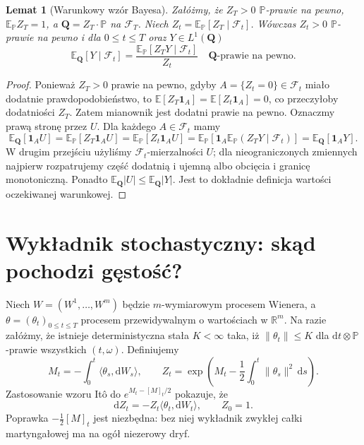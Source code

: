 \documentclass[11pt,a4paper,oneside]{report}
\numberwithin{equation}{chapter}
\theoremstyle{plain}
\newtheorem{lemat}[twierdzenie]{Lemat}
\theoremstyle{definition}
\theoremstyle{remark}
\newcommand{\R}{\mathbb{R}}
\newcommand{\Prob}{\mathbb{P}}
\newcommand{\E}{\mathbb{E}}
\newcommand{\calF}{\mathcal{F}}
\newcommand{\ind}[1]{\mathbf{1}_{#1}}
\newcommand{\dd}{\mathrm{d}}
\newcommand{\norm}[1]{\lVert #1\rVert}
\begin{document}
\begin{lemat}[Warunkowy wzór Bayesa]
\label{lem:bayes-change}
Załóżmy, że $Z_T>0$ $\Prob$-prawie na pewno,
$\E_{\Prob}Z_T=1$, a $\mathbf Q=Z_T\cdot\Prob$
na $\calF_T$. Niech $Z_t=\E_{\Prob}[Z_T\mid\calF_t]$.
Wówczas $Z_t>0$ $\Prob$-prawie na pewno i dla
$0\le t\le T$ oraz $Y\in L^1(\mathbf Q)$
\[
\E_{\mathbf Q}[Y\mid\calF_t]
=\frac{\E_{\Prob}[Z_TY\mid\calF_t]}{Z_t}
\quad\mathbf Q\text{-prawie na pewno}.
\tag{8.1}\label{eq:bayes-measure}
\]
\end{lemat}
\begin{proof}
Ponieważ $Z_T>0$ prawie na pewno, gdyby
$A=\{Z_t=0\}\in\calF_t$ miało dodatnie prawdopodobieństwo,
to $\E[Z_T\ind A]=\E[Z_t\ind A]=0$,
co przeczyłoby dodatniości $Z_T$. Zatem mianownik
jest dodatni prawie na pewno. Oznaczmy prawą stronę
przez $U$. Dla każdego $A\in\calF_t$ mamy
\[
\E_{\mathbf Q}[\ind A U]
=\E_{\Prob}[Z_T\ind A U]
=\E_{\Prob}[Z_t\ind A U]
=\E_{\Prob}[\ind A\E_{\Prob}(Z_TY\mid\calF_t)]
=\E_{\mathbf Q}[\ind A Y].
\]
W drugim przejściu użyliśmy $\calF_t$-mierzalności $U$;
dla nieograniczonych zmiennych najpierw rozpatrujemy
część dodatnią i ujemną albo obcięcia i granicę monotoniczną.
Ponadto $\E_{\mathbf Q}|U|\le\E_{\mathbf Q}|Y|$.
Jest to dokładnie definicja wartości oczekiwanej warunkowej.
\end{proof}

\section{Wykładnik stochastyczny: skąd pochodzi gęstość?}

Niech $W=(W^1,\ldots,W^m)$ będzie $m$-wymiarowym
procesem Wienera, a $\theta=(\theta_t)_{0\le t\le T}$
procesem przewidywalnym o wartościach w $\R^m$.
Na razie załóżmy, że istnieje deterministyczna stała
$K<\infty$ taka, iż $\norm{\theta_t}\le K$
dla $\dd t\otimes\Prob$-prawie wszystkich $(t,\omega)$.
Definiujemy
\[
M_t=-\int_0^t\langle\theta_s,\dd W_s\rangle,
\qquad
Z_t=\exp\left(M_t-\frac12\int_0^t\norm{\theta_s}^2\,\dd s\right).
\tag{8.2}\label{eq:girsanov-density}
\]
Zastosowanie wzoru Itô do $e^{M_t-[M]_t/2}$
pokazuje, że
\[
\dd Z_t=-Z_t\langle\theta_t,\dd W_t\rangle,
\qquad Z_0=1.
\tag{8.3}\label{eq:density-sde}
\]
Poprawka $-\frac12[M]_t$ jest niezbędna: bez niej
wykładnik zwykłej całki martyngałowej ma na ogół
niezerowy dryf.
\end{document}

